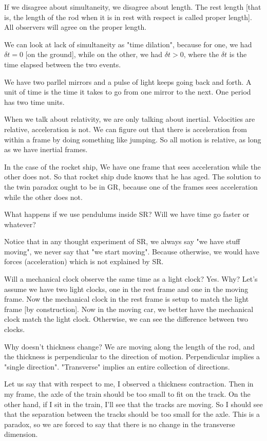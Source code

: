 \documentclass[11pt]{book}
\begin{document}
If we disagree about simultaneity, we disagree about length.
The rest length [that is, the length of the rod when it is in rest with respect
is called proper length]. All observers will agree on the proper length.


We can look at lack of simultaneity as "time dilation", because for one,
we had $\delta t = 0$ [on the ground], while on the other, we had $\delta t > 0$,
where the $\delta t$ is the time elapsed between the two events.

We have two parllel mirrors and a pulse of light keeps going back and forth.
A unit of time is the time it takes to go from one mirror to the next. One period
has two time units.


When we talk about relativity, we are only talking about inertial. Velocities
are relative, acceleration is not. We can figure out that there is acceleration
from within a frame by doing something like jumping. So all motion is relative,
as long as we have inertial frames.


In the case of the rocket ship, We have one frame that sees acceleration while
the other does not. So that rocket ship dude knows that he has aged. The
solution to the twin paradox ought to be in GR, because one of the frames sees
acceleration while the other does not.

What happens if we use pendulums inside SR? Will we have time go faster
or whatever?

Notice that in any thought experiment of SR, we always say "we have stuff moving",
we never say that "we start moving". Because otherwise, we would have forces
(acceleration) which is not explained by SR.


Will a mechanical clock observe the same time as a light clock? Yes. Why? Let's
assume we have two light clocks, one in the rest frame and one in the moving
frame. Now the mechanical clock in the rest frame is setup to match the light
frame [by construction]. Now in the moving car, we better have the mechanical
clock match the light clock. Otherwise, we can see the difference between
two clocks.

Why doesn't thickness change? We are moving along the length of the rod, and
the thickness is perpendicular to the direction of motion. Perpendicular
implies a "single direction". "Transverse" implies an entire collection of
directions.

Let us say that with respect to me, I observed a thickness contraction.
Then in my frame, the axle of the train should be too small to fit on the track.
On the other hand, if I sit in the train, I'll see that the tracks are moving.
So I should see that the separation between the tracks should be too small
for the axle. This is a paradox, so we are forced to say that there is no change
in the transverse dimension.
\end{document}
